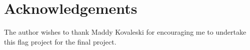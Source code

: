 \documentclass[11pt]{amsart}
\begin{document}
\section*{Acknowledgements}

The author wishes to thank Maddy Kovaleski for encouraging me to undertake this
flag project for the final project.



\end{document}
